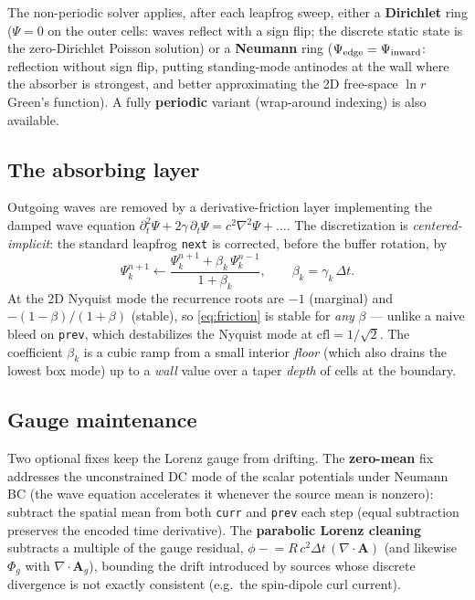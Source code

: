 \documentclass[11pt]{article}
\newcommand{\Phig}{\Phi_g}                 %
\newcommand{\Ag}{\mathbf{A}_g}             %
\newcommand{\vv}[1]{\mathbf{#1}}           %
\newcommand{\dt}{\Delta t}                 %
\begin{document}
The non-periodic solver applies, after each leapfrog sweep, either a
\textbf{Dirichlet} ring ($\Psi=0$ on the outer cells: waves reflect with a sign
flip; the discrete static state is the zero-Dirichlet Poisson solution) or a
\textbf{Neumann} ring ($\Psi_{\rm edge}=\Psi_{\rm inward}$: reflection without
sign flip, putting standing-mode antinodes at the wall where the absorber is
strongest, and better approximating the 2D free-space $\ln r$ Green's function).
A fully \textbf{periodic} variant (wrap-around indexing) is also available.

\subsection{The absorbing layer}

Outgoing waves are removed by a derivative-friction layer implementing the damped
wave equation $\partial_t^2\Psi+2\gamma\,\partial_t\Psi=c^2\nabla^2\Psi+\dots$.
The discretization is \emph{centered-implicit}: the standard leapfrog
\texttt{next} is corrected, before the buffer rotation, by
\begin{equation}
\label{eq:friction}
  \Psi^{n+1}_k \leftarrow \frac{\Psi^{n+1}_k + \beta_k\,\Psi^{n-1}_k}{1+\beta_k},
  \qquad \beta_k=\gamma_k\,\dt .
\end{equation}
At the 2D Nyquist mode the recurrence roots are $-1$ (marginal) and
$-(1-\beta)/(1+\beta)$ (stable), so \eqref{eq:friction} is stable for \emph{any}
$\beta$ --- unlike a naive bleed on \texttt{prev}, which destabilizes the Nyquist
mode at $\mathrm{cfl}=1/\sqrt2$. The coefficient $\beta_k$ is a cubic ramp from a
small interior \emph{floor} (which also drains the lowest box mode) up to a
\emph{wall} value over a taper \emph{depth} of cells at the boundary.

\subsection{Gauge maintenance}

Two optional fixes keep the Lorenz gauge from drifting. The \textbf{zero-mean}
fix addresses the unconstrained DC mode of the scalar potentials under Neumann
BC (the wave equation accelerates it whenever the source mean is nonzero):
subtract the spatial mean from both \texttt{curr} and \texttt{prev} each step
(equal subtraction preserves the encoded time derivative). The
\textbf{parabolic Lorenz cleaning} subtracts a multiple of the gauge residual,
$\phi\mathrel{-}=R\,c^2\dt\,(\nabla\!\cdot\vv A)$ (and likewise $\Phig$ with
$\nabla\!\cdot\Ag$), bounding the drift introduced by sources whose discrete
divergence is not exactly consistent (e.g.\ the spin-dipole curl current).
\end{document}
